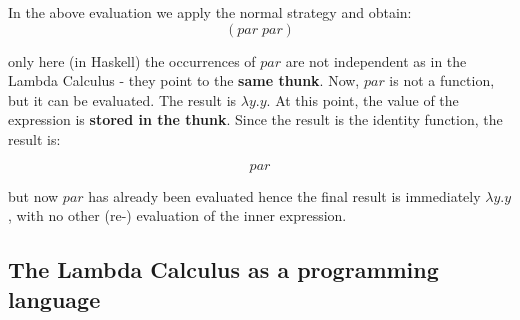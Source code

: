 In the above evaluation we apply the normal strategy and obtain:
$$ (par\;par)$$

only here (in Haskell) the occurrences of $par$ are not independent as in the Lambda Calculus - they point to the \textbf{same thunk}. Now, $par$ is not a function, but it can be evaluated. The result is $\lambda y.y$. At this point, the value of the expression is \textbf{stored in the thunk}. Since the result is the identity function, the result is:

$$par $$

but now $par$ has already been evaluated hence the final result is immediately $\lambda y.y$, with no other (re-) evaluation of the inner expression.

\subsection*{ The Lambda Calculus as a programming language }

 


